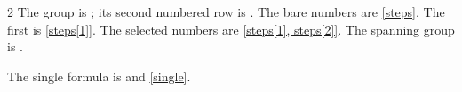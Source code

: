 \documentclass[language=english]{.labforge}
\begin{document}
\begin{multicols}{2}
The group is ; its second numbered row is .
The bare numbers are \ref{steps}. The first is \ref{steps[1]}.
The selected numbers are \ref{steps[1], steps[2]}.
The spanning group is .
\end{multicols}
The single formula is  and \ref{single}.
\end{document}
